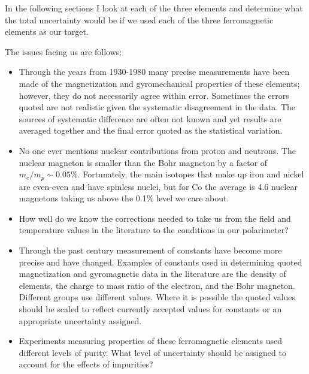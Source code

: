 \documentclass[12pt]{article}
\begin{document}
In the following sections I look at each of the three elements and determine what the total uncertainty would be if we used each of the three ferromagnetic elements as our target.

The issues facing us are follows:
\begin{itemize}
\item{Through the years from 1930-1980 many precise measurements have been made of the magnetization and gyromechanical properties of these elements; however, they do not necessarily agree within error. Sometimes the errors quoted are not realistic given the systematic disagreement in the data. The sources of systematic difference are often not known and yet results are averaged together and the final error quoted as the statistical variation.}
\item{No one ever mentions nuclear contributions from proton and neutrons. The nuclear magneton is smaller than the Bohr magneton by a factor of $m_e/m_p\sim0.05\%$. Fortunately, the main isotopes that make up iron and nickel are even-even and have spinless nuclei, but for Co the average is 4.6 nuclear magnetons taking us above the 0.1\% level we care about.}
\item{How well do we know the corrections needed to take us from the field and temperature values in the literature to the conditions in our polarimeter?}
\item{Through the past century measurement of constants have become more precise and have changed. Examples of constants used in determining quoted magnetization and gyromagnetic data in the literature are the density of elements, the charge to mass ratio of the electron, and the Bohr magneton. Different groups use different values. Where it is possible the quoted values should be scaled to reflect currently accepted values for constants or an appropriate uncertainty assigned.}
\item{Experiments measuring properties of these ferromagnetic elements used different levels of purity. What level of uncertainty should be assigned to account for the effects of impurities?}
\end{itemize}

\
\end{document}
